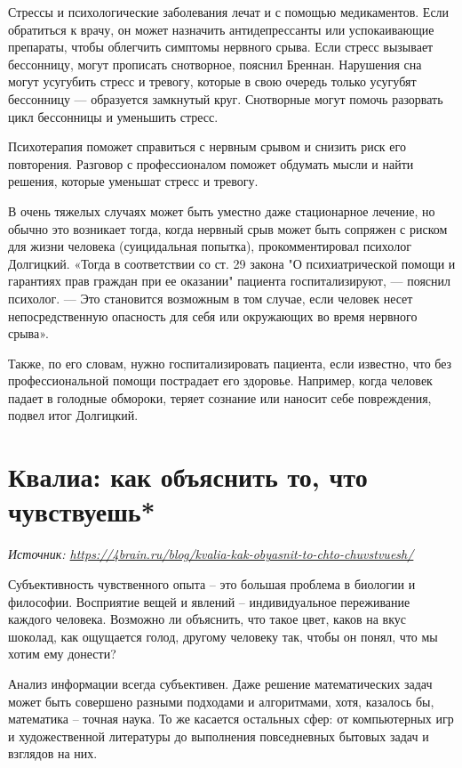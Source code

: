 Стрессы и психологические заболевания лечат и с помощью медикаментов. Если обратиться к врачу, он может назначить антидепрессанты или успокаивающие препараты, чтобы облегчить симптомы нервного срыва. Если стресс вызывает бессонницу, могут прописать снотворное, пояснил Бреннан. Нарушения сна могут усугубить стресс и тревогу, которые в свою очередь только усугубят бессонницу  ---  образуется замкнутый круг. Снотворные могут помочь разорвать цикл бессонницы и уменьшить стресс.

Психотерапия поможет справиться с нервным срывом и снизить риск его повторения. Разговор с профессионалом поможет обдумать мысли и найти решения, которые уменьшат стресс и тревогу.

В очень тяжелых случаях может быть уместно даже стационарное лечение, но обычно это возникает тогда, когда нервный срыв может быть сопряжен с риском для жизни человека (суицидальная попытка), прокомментировал психолог Долгицкий. «Тогда в соответствии со ст. 29 закона "О психиатрической помощи и гарантиях прав граждан при ее оказании" пациента госпитализируют,  ---  пояснил психолог.  ---  Это становится возможным в том случае, если человек несет непосредственную опасность для себя или окружающих во время нервного срыва».

Также, по его словам, нужно госпитализировать пациента, если известно, что без профессиональной помощи пострадает его здоровье. Например, когда человек падает в голодные обмороки, теряет сознание или наносит себе повреждения, подвел итог Долгицкий.

\newpage
\section{Квалиа: как объяснить то, что чувствуешь*}

\textit{Источник: \url{https://4brain.ru/blog/kvalia-kak-obyasnit-to-chto-chuvstvuesh/}}

Субъективность чувственного опыта – это большая проблема в биологии и философии. Восприятие вещей и явлений – индивидуальное переживание каждого человека. Возможно ли объяснить, что такое цвет, каков на вкус шоколад, как ощущается голод, другому человеку так, чтобы он понял, что мы хотим ему донести?

Анализ информации всегда субъективен. Даже решение математических задач может быть совершено разными подходами и алгоритмами, хотя, казалось бы, математика – точная наука. То же касается остальных сфер: от компьютерных игр и художественной литературы до выполнения повседневных бытовых задач и взглядов на них.

